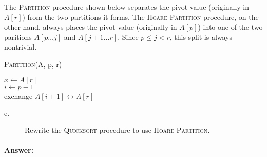 \documentclass[a4paper,10pt]{article}
\newcommand{\answer}{\paragraph{Answer:}}
\begin{document}
The \textsc{Partition} procedure shown below separates the pivot value (originally in $A[r]$) from the
two partitions it forms. The \textsc{Hoare-Partition} procedure,
on the other hand, always places the pivot value (originally in $A[p]$) into one of the two paritions
$A[p\ldots j]$ and $A[j + 1\ldots r]$. Since $p\leq j < r$, this
split is always nontrivial.

\begin{algorithm}[H]
\caption{\textsc{Partition}(A, p, r)}
$x\leftarrow A[r]$\\
$i \leftarrow p - 1$\\
exchange $A[i + 1]\leftrightarrow A[r]$\\
\end{algorithm}

\begin{description}
\item[e. \hspace{9pt}] Rewrite the \textsc{Quicksort} procedure to use \textsc{Hoare-Partition}.
\end{description}

\newpage

\answer
\end{document}

